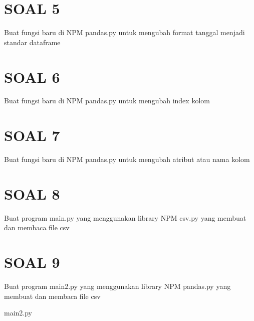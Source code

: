 \documentclass[12pt, times new roman]{report}
\begin{document}


\section*{SOAL 5}
Buat fungsi baru di NPM pandas.py untuk mengubah format tanggal menjadi standar dataframe



\section*{SOAL 6}
Buat fungsi baru di NPM pandas.py untuk mengubah index kolom



\section*{SOAL 7}
Buat fungsi baru di NPM pandas.py untuk mengubah atribut atau nama kolom



\section*{SOAL 8}
Buat program main.py yang menggunakan library NPM csv.py yang membuat dan membaca file csv




\section*{SOAL 9}
Buat program main2.py yang menggunakan library NPM pandas.py yang membuat dan membaca file csv


\caption{main2.py}

\end{document}
